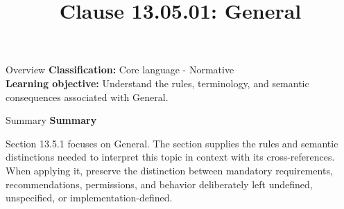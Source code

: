 \documentclass[10pt,letterpaper]{article}
\title{Clause 13.05.01: General}
\author{}
\date{}
\begin{document}
\maketitle
\begin{CornellOverviewBox}{Overview}
\textbf{Classification:} Core language - Normative\\[2pt]
\textbf{Learning objective:} Understand the rules, terminology, and semantic consequences associated with General.
\end{CornellOverviewBox}\begin{CornellSummaryBox}{Summary}
{\sffamily\bfseries\color{Accent} Summary}\par\vspace{3pt}Section 13.5.1 focuses on General. The section supplies the rules and semantic distinctions needed to interpret this topic in context with its cross-references. When applying it, preserve the distinction between mandatory requirements, recommendations, permissions, and behavior deliberately left undefined, unspecified, or implementation-defined.
\end{CornellSummaryBox}
\end{document}
